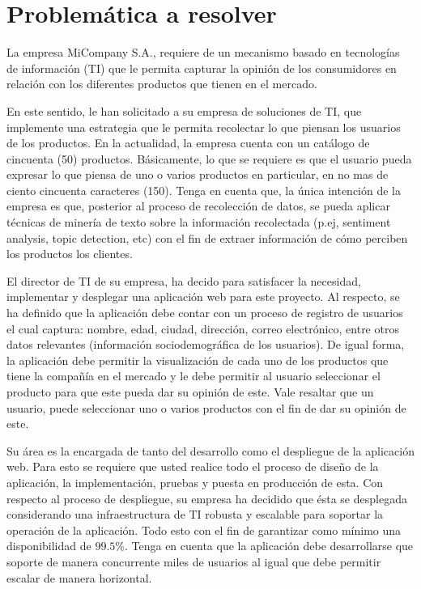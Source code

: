 \section{Problemática a resolver}

La empresa MiCompany S.A., requiere de un mecanismo basado en tecnologías de 
información (TI) que le permita capturar la opinión de los consumidores en
relación con los diferentes productos que tienen en el mercado.

En este sentido, le han solicitado a su empresa de soluciones de TI, que
implemente una estrategia que le permita recolectar lo que piensan los usuarios
de los productos. En la actualidad, la empresa cuenta con un catálogo de
cincuenta (50) productos. Básicamente, lo que se requiere es que el usuario
pueda expresar lo que piensa de uno o varios productos en particular, en no mas
de ciento cincuenta caracteres (150). Tenga en cuenta que, la única intención de
la empresa es que, posterior al proceso de recolección de datos, se pueda
aplicar técnicas de minería de texto sobre la información recolectada (p.ej, 
sentiment analysis, topic detection, etc) con el fin de extraer información de
cómo perciben los productos los clientes.

El director de TI de su empresa, ha decido para satisfacer la necesidad, implementar y 
desplegar una aplicación web para este proyecto. Al respecto, se ha definido que la 
aplicación debe contar con un proceso de registro de usuarios el cual captura: nombre, 
edad, ciudad, dirección, correo electrónico, entre otros datos relevantes (información 
sociodemográfica de los usuarios). De igual forma, la aplicación debe permitir la 
visualización de cada uno de los productos que tiene la compañía en el mercado y le debe 
permitir al usuario seleccionar el producto para que este pueda dar su opinión de este. 
Vale resaltar que un usuario, puede seleccionar uno o varios productos con el fin de dar 
su opinión de este.

Su área es la encargada de tanto del desarrollo como el despliegue de la aplicación web. 
Para esto se requiere que usted realice todo el proceso de diseño de la aplicación, la 
implementación, pruebas y puesta en producción de esta. Con respecto al proceso de 
despliegue, su empresa ha decidido que ésta se desplegada considerando una 
infraestructura de TI robusta y escalable para soportar la operación de la aplicación. Todo 
esto con el fin de garantizar como mínimo una disponibilidad de $99.5\%$. Tenga en cuenta 
que la aplicación debe desarrollarse que soporte de manera concurrente miles de
usuarios al igual que debe permitir escalar de manera horizontal.

